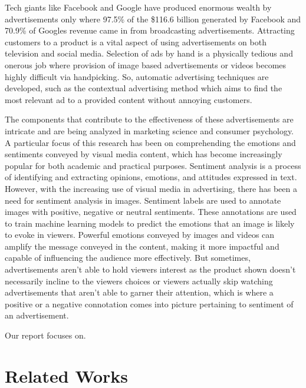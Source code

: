 \documentclass[conference]{IEEEtran}
\begin{document}
Tech giants like Facebook and Google have produced enormous wealth by advertisements only where 97.5\% of the \$116.6 billion generated by Facebook\cite{b1} and 70.9\% of Googles revenue\cite{b2} came in from broadcasting advertisements. Attracting customers to a product is a vital aspect of using  advertisements on both television and social media. Selection of ads by hand is a physically tedious and onerous job where provision of image based advertisements or videos becomes highly difficult via handpicking. So, automatic advertising techniques are developed, such as the contextual advertising method which aims to find the most relevant ad to a provided content without annoying customers.

The components that contribute to the effectiveness of these advertisements are intricate and are being analyzed in marketing science and consumer psychology. A particular focus of this research has been on comprehending the emotions and sentiments conveyed by visual media content, which has become increasingly popular for both academic and practical purposes. Sentiment analysis is a process of identifying and extracting opinions, emotions, and attitudes expressed in text. However, with the increasing use of visual media in advertising, there has been a need for sentiment analysis in images. Sentiment labels are used to annotate images with positive, negative or neutral sentiments. These annotations are used to train machine learning models to predict the emotions that an image is likely to evoke in viewers.
Powerful emotions conveyed by images and videos can amplify the message conveyed in the content, making it more impactful and capable of influencing the audience more effectively. But sometimes, advertisements aren’t able to hold viewers interest as the product shown doesn’t necessarily incline to the viewers choices or viewers actually skip watching advertisements that aren’t able to garner their attention, which is where a positive or a negative connotation comes into picture pertaining to sentiment of an advertisement.

Our report focuses on.


\section{Related Works}
\end{document}
